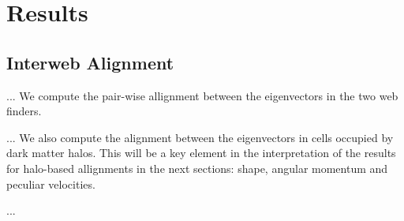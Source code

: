 \documentclass[usenatbib]{mn2e}
\begin{document}
\section{Results}

\subsection{Interweb Alignment}
... We compute the pair-wise allignment between the eigenvectors in
the two web finders. 

... We also compute the alignment between the eigenvectors in cells
occupied by dark matter halos. This will be a key element in the
interpretation of the results for halo-based allignments in the next
sections: shape, angular momentum and peculiar velocities.

... 
\end{document}

